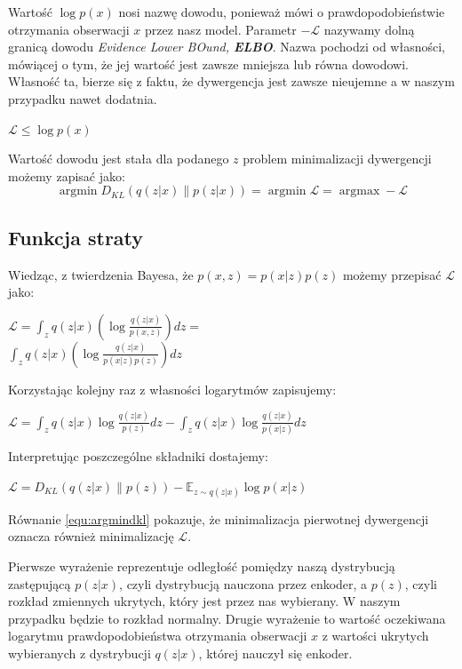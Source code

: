 \documentclass[a4paper,12pt]{book} %
\begin{document}
Wartość $\log p(x)$ nosi nazwę dowodu, ponieważ mówi o prawdopodobieństwie otrzymania obserwacji $x$ przez nasz model.
Parametr $-\mathcal{L}$ nazywamy dolną granicą dowodu \textit{Evidence Lower BOund, \textbf{ELBO}}. Nazwa pochodzi od własności, mówiącej o tym, że jej wartość jest zawsze mniejsza lub równa dowodowi. Własność ta, bierze się z faktu, że 
dywergencja jest zawsze nieujemne a w naszym przypadku nawet dodatnia. 
\begin{center}
	$\mathcal{L}\leq\log p(x)$
\end{center}
Wartość dowodu jest stała dla podanego $z$ problem minimalizacji dywergencji możemy zapisać jako:
\begin{equation}
	\operatorname*{argmin}D_{KL}(q(z|x)\|p(z|x)) = \operatorname*{argmin}\mathcal{L} = \operatorname*{argmax}-\mathcal{L}
	\label{equ:argmindkl}
\end{equation}
\subsection{Funkcja straty}
Wiedząc, z twierdzenia Bayesa, że $p(x,z) = p(x|z)p(z)$ możemy przepisać $\mathcal{L}$ jako:
\begin{center}
	$\mathcal{L}=\displaystyle\int_{z}^{}q(z|x)\left( \log\frac{q(z|x)}{p(x,z)}\right)dz=$\\
	$\displaystyle\int_{z}^{}q(z|x)\left( \log\frac{q(z|x)}{p(x|z)p(z)}\right)dz$
\end{center}
Korzystając kolejny raz z własności logarytmów zapisujemy:
\begin{center}
	$\mathcal{L}=\displaystyle\int_{z}^{}q(z|x)\log\frac{q(z|x)}{p(z)}dz - \displaystyle\int_{z}^{}q(z|x)\log\frac{q(z|x)}{p(x|z)}dz$
\end{center}
Interpretując poszczególne składniki dostajemy:
\begin{center}
	$\mathcal{L} =  D_{KL}(q(z|x)\|p(z)) - \mathbb{E}_{z\sim q(z|x)}\log p(x|z)$
\end{center}
Równanie \ref{equ:argmindkl} pokazuje, że minimalizacja pierwotnej dywergencji oznacza również minimalizację $\mathcal{L}$. 

Pierwsze wyrażenie reprezentuje odległość pomiędzy naszą dystrybucją zastępującą $p(z|x)$, czyli dystrybucją nauczona przez enkoder, a $p(z)$, czyli rozkład zmiennych ukrytych, który jest przez nas wybierany. W naszym przypadku będzie to rozkład normalny. Drugie wyrażenie to wartość oczekiwana logarytmu prawdopodobieństwa otrzymania obserwacji $x$ z wartości ukrytych wybieranych z dystrybucji $q(z|x)$, której nauczył się enkoder.
\end{document}
